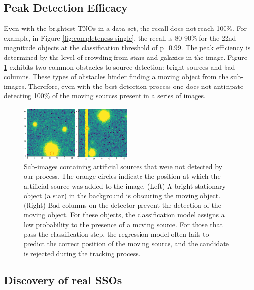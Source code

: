 \documentclass{aastex631}
\begin{document}
\subsection{Peak Detection Efficacy}
\label{subsect: Peak Detection Efficacy}

Even with the brightest TNOs in a data set, the recall does not reach 100\%.
For example, in Figure \ref{fig:completeness single}, the recall is 80-90\% for the 22nd magnitude objects at the classification threshold of p=0.99.
The peak efficiency is determined by the level of crowding from stars and galaxies in the image.
Figure \ref{fig:obstacles} exhibits two common obstacles to source detection: bright sources and bad columns.
These types of obstacles hinder finding a moving object from the sub-images.
Therefore, even with the best detection process one does not anticipate detecting 100\% of the moving sources present in a series of images.

\begin{figure}[htb]
    \centering
    \includegraphics[width=0.5\textwidth,keepaspectratio]{Figures/obstacles.png}
    \caption{Sub-images containing artificial sources that were not detected by our process.
    The orange circles indicate the position at which the artificial source was added to the image.
    (Left) A bright stationary object (a star) in the background is obscuring the moving object.  
    (Right) Bad columns on the detector prevent the detection of the moving object.
    For these objects, the classification model assigns a low probability to the presence of a moving source.  
    For those that pass the classification step, the regression model often fails to predict the correct position of the moving source, and the candidate is rejected during the tracking process.
}
    \label{fig:obstacles}
\end{figure}

\subsection{Discovery of real SSOs}
\label{subsect:Discovery of real SSOs}
\end{document}

